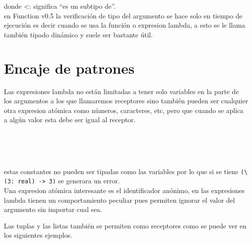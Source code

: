       donde <: significa ``es un subtipo de''.
      \\
      
      en Function v0.5 la verificación de tipo del argumento se hace solo en tiempo de ejecución es decir cuando se usa la función o expresion lambda, a esto se le llama también tipado dinámico y suele ser bastante útil.
      
   \section{Encaje de patrones}
      Las expresiones lambda no están limitadas a tener solo variables en la parte de los argumentos a los que llamaremos receptores sino también pueden ser cualquier otra expresion atómica como números, caracteres, etc, pero que cuando se aplica a algún valor esta debe ser igual al receptor.
      
      \begin{fxcode}
         \\
         \\
         \\
      \end{fxcode}
      
      estas constantes no pueden ser tipadas como las variables por lo que si se tiene \texttt{(\textbackslash(3: real) ->~3)} se generara un error.
      \\
      
      Una expresion atómica interesante es el identificador anónimo, en las expresiones lambda tienen un comportamiento peculiar pues permiten ignorar el valor del argumento sin importar cual sea.
      
      \begin{fxcode}
      \end{fxcode}
      
      Las tuplas y las listas también se permiten como receptores como se puede ver en los siguientes ejemplos.
      
      \begin{fxcode}
         \\
         \\
         \\
      \end{fxcode}
      
